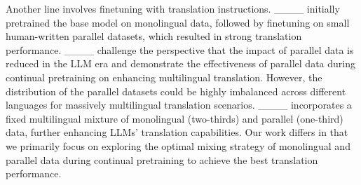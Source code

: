 Another line involves finetuning with translation instructions. ____ initially pretrained the base model on monolingual data, followed by finetuning on small human-written parallel datasets, which resulted in strong translation performance. ____ challenge the perspective that the impact of parallel data is reduced in the LLM era and demonstrate the effectiveness of parallel data during continual pretraining on enhancing multilingual translation. However, the distribution of the parallel datasets could be highly imbalanced across different languages for massively multilingual translation scenarios. ____ incorporates a fixed multilingual mixture of monolingual (two-thirds) and parallel (one-third) data, further enhancing LLMs' translation capabilities. Our work differs in that we primarily focus on exploring the optimal mixing strategy of monolingual and parallel data during continual pretraining to achieve the best translation performance.